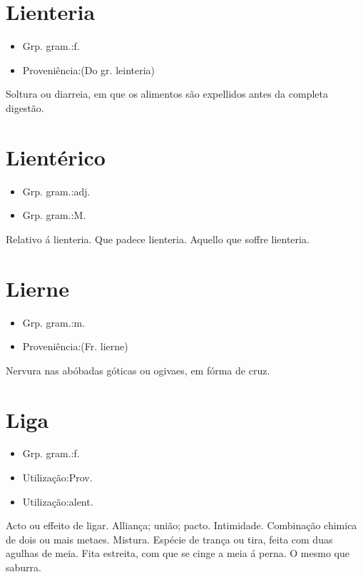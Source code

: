 \section{Lienteria}
\begin{itemize}
\item {Grp. gram.:f.}
\end{itemize}
\begin{itemize}
\item {Proveniência:(Do gr. \textunderscore leinteria\textunderscore )}
\end{itemize}
Soltura ou diarreia, em que os alimentos são expellidos antes da completa digestão.
\section{Lientérico}
\begin{itemize}
\item {Grp. gram.:adj.}
\end{itemize}
\begin{itemize}
\item {Grp. gram.:M.}
\end{itemize}
Relativo á lienteria.
Que padece lienteria.
Aquello que soffre lienteria.
\section{Lierne}
\begin{itemize}
\item {Grp. gram.:m.}
\end{itemize}
\begin{itemize}
\item {Proveniência:(Fr. \textunderscore lierne\textunderscore )}
\end{itemize}
Nervura nas abóbadas góticas ou ogivaes, em fórma de cruz.
\section{Liga}
\begin{itemize}
\item {Grp. gram.:f.}
\end{itemize}
\begin{itemize}
\item {Utilização:Prov.}
\end{itemize}
\begin{itemize}
\item {Utilização:alent.}
\end{itemize}
Acto ou effeito de ligar.
Alliança; união; pacto.
Intimidade.
Combinação chimica de dois ou mais metaes.
Mistura.
Espécie de trança ou tira, feita com duas agulhas de meia.
Fita estreita, com que se cinge a meia á perna.
O mesmo que \textunderscore saburra\textunderscore .
